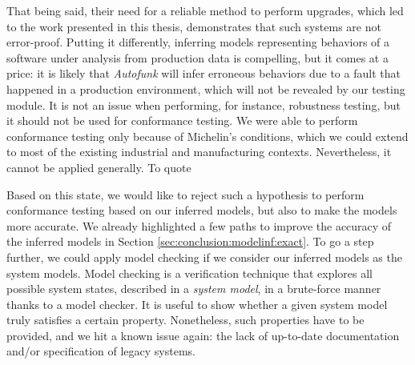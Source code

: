 That being said, their need for a reliable method to perform
upgrades, which led to the work presented in this thesis,
demonstrates that such systems are not error-proof. Putting it
differently, inferring models representing behaviors of a
software under analysis from production data is compelling, but
it comes at a price: it is likely that \textit{Autofunk} will
infer erroneous behaviors due to a fault that happened in a
production environment, which will not be revealed by our testing
module. It is not an issue when performing, for instance,
robustness testing, but it should not be used for conformance
testing. We were able to perform conformance testing only because
of Michelin's conditions, which we could extend to most of the
existing industrial and manufacturing contexts. Nevertheless, it
cannot be applied generally. To quote

Based on this state, we would like to reject such a hypothesis to
perform conformance testing based on our inferred models, but
also to make the models more accurate. We already highlighted a
few paths to improve the accuracy of the inferred models in
Section \ref{sec:conclusion:modelinf:exact}. To go a step
further, we could apply model checking \cite{baier2008principles}
if we consider our inferred models as the system models. Model
checking is a verification technique that explores all possible
system states, described in a \textit{system model}, in a
brute-force manner thanks to a model checker. It is useful to
show whether a given system model truly satisfies a certain
property.  Nonetheless, such properties have to be provided, and
we hit a known issue again: the lack of up-to-date documentation
and/or specification of legacy systems.
